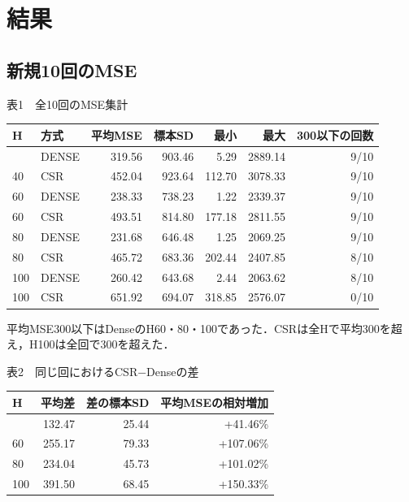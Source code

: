 \documentclass[
  10pt,
  a4paper,
]{article}
\begin{document}

\section{結果}\label{ux7d50ux679c}

\subsection{新規10回のMSE}\label{ux65b0ux898f10ux56deux306emse}

\begingroup\centering\setlength{\parindent}{0pt}

表1　全10回のMSE集計

\par\endgroup

\begin{longtable}[]{@{}llrrrrr@{}}
\toprule\noalign{}
H & 方式 & 平均MSE & 標本SD & 最小 & 最大 & 300以下の回数 \\
\midrule\noalign{}
\endhead
\bottomrule\noalign{}
\endlastfoot
40 & DENSE & 319.56 & 903.46 & 5.29 & 2889.14 & 9/10 \\
40 & CSR & 452.04 & 923.64 & 112.70 & 3078.33 & 9/10 \\
60 & DENSE & 238.33 & 738.23 & 1.22 & 2339.37 & 9/10 \\
60 & CSR & 493.51 & 814.80 & 177.18 & 2811.55 & 9/10 \\
80 & DENSE & 231.68 & 646.48 & 1.25 & 2069.25 & 9/10 \\
80 & CSR & 465.72 & 683.36 & 202.44 & 2407.85 & 8/10 \\
100 & DENSE & 260.42 & 643.68 & 2.44 & 2063.62 & 8/10 \\
100 & CSR & 651.92 & 694.07 & 318.85 & 2576.07 & 0/10 \\
\end{longtable}

平均MSE300以下はDenseのH60・80・100であった．CSRは全Hで平均300を超え，H100は全回で300を超えた．


\begingroup\centering\setlength{\parindent}{0pt}

表2　同じ回におけるCSR−Denseの差

\par\endgroup

\begin{longtable}[]{@{}lrrr@{}}
\toprule\noalign{}
H & 平均差 & 差の標本SD & 平均MSEの相対増加 \\
\midrule\noalign{}
\endhead
\bottomrule\noalign{}
\endlastfoot
40 & 132.47 & 25.44 & +41.46\% \\
60 & 255.17 & 79.33 & +107.06\% \\
80 & 234.04 & 45.73 & +101.02\% \\
100 & 391.50 & 68.45 & +150.33\% \\
\end{longtable}
\end{document}
